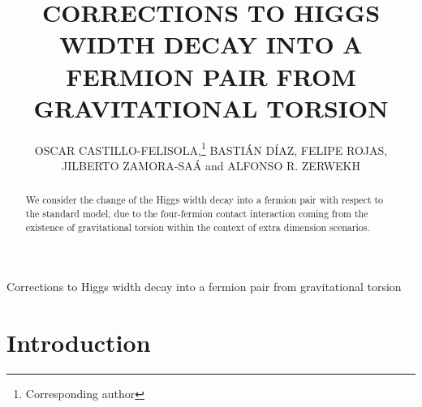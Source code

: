 \documentclass{ws-mpla}
\renewcommand{\(}{\left(}
\renewcommand{\)}{\right)}
\renewcommand{\[}{\left[}
\renewcommand{\]}{\right]}
\newcommand\UTFSM{Departamento de F\'\i sica, Universidad T\'{e}cnica Federico Santa Mar\'\i a, \\ Casilla 110-V, Valpara\'\i so, Chile}
\newcommand\CCTVal{Centro Cient\'\i fico Tecnol\'ogico de Valpara\'\i so, \\ Casilla 110-V, Valpara\'\i so, Chile}
\begin{document}
{Corrections to Higgs width decay into a fermion pair from gravitational torsion}

\catchline{}{}{}{}{}


\title{CORRECTIONS TO HIGGS WIDTH DECAY INTO A FERMION PAIR FROM GRAVITATIONAL TORSION}

\author{OSCAR {CASTILLO-FELISOLA},\footnote{Corresponding author} \quad BASTI\'AN {D\'IAZ}, \quad  FELIPE {ROJAS}, \\ JILBERTO {ZAMORA-SA\'A} and ALFONSO R. {ZERWEKH}}

\address{\UTFSM, and \\ \CCTVal. \\ o.castillo.felisola@gmail.com}

\maketitle



\begin{abstract}
  We consider the change of the Higgs width decay into a fermion pair  with respect to the standard model, due to the four-fermion contact interaction coming from the existence of gravitational torsion within the context of extra dimension scenarios.
\end{abstract}





\section{Introduction}\label{intro}

\end{document}
